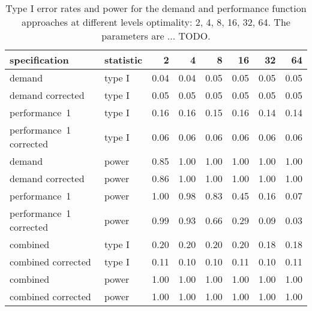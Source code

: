 \begin{table}[ht]
\centering
\begingroup\footnotesize
\begin{tabular}{llrrrrrr}
  \hline
specification & statistic & 2 & 4 & 8 & 16 & 32 & 64 \\ 
  \hline
demand & type I & 0.04 & 0.04 & 0.05 & 0.05 & 0.05 & 0.05 \\ 
  demand corrected & type I & 0.05 & 0.05 & 0.05 & 0.05 & 0.05 & 0.05 \\ 
  performance~1 & type I & 0.16 & 0.16 & 0.15 & 0.16 & 0.14 & 0.14 \\ 
  performance~1 corrected & type I & 0.06 & 0.06 & 0.06 & 0.06 & 0.06 & 0.06 \\ 
  demand & power & 0.85 & 1.00 & 1.00 & 1.00 & 1.00 & 1.00 \\ 
  demand corrected & power & 0.86 & 1.00 & 1.00 & 1.00 & 1.00 & 1.00 \\ 
  performance~1 & power & 1.00 & 0.98 & 0.83 & 0.45 & 0.16 & 0.07 \\ 
  performance~1 corrected & power & 0.99 & 0.93 & 0.66 & 0.29 & 0.09 & 0.03 \\ 
  combined & type I & 0.20 & 0.20 & 0.20 & 0.20 & 0.18 & 0.18 \\ 
  combined corrected & type I & 0.11 & 0.10 & 0.10 & 0.11 & 0.10 & 0.11 \\ 
  combined & power & 1.00 & 1.00 & 1.00 & 1.00 & 1.00 & 1.00 \\ 
  combined corrected & power & 1.00 & 1.00 & 1.00 & 1.00 & 1.00 & 1.00 \\ 
   \hline
\end{tabular}
\endgroup
\caption{Type I error rates and power for the demand and
             performance function approaches at different levels optimality:
             2, 4, 8, 16, 32, 64. The parameters are ... TODO.} 
\label{main-table}
\end{table}
